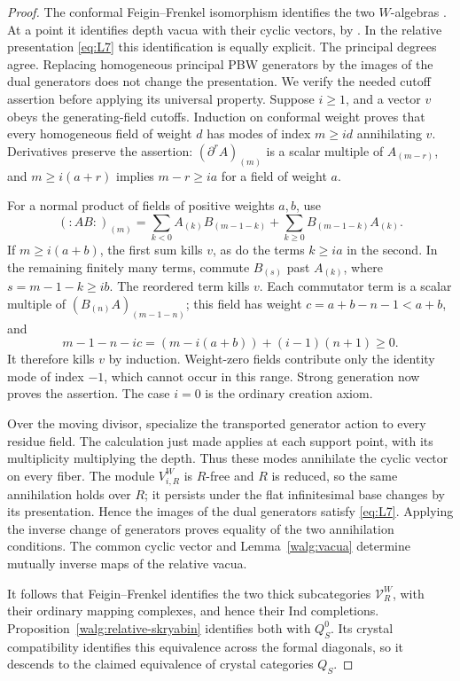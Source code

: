 \begin{proof}
The conformal Feigin--Frenkel isomorphism identifies the two
\(W\)-algebras \cite{FeiginFrenkel}.  At a point it identifies depth
vacua with their cyclic vectors, by \cite[Lemma~7.3.3]{RaskinW}.  In the relative
presentation \eqref{eq:L7} this identification is equally explicit.
The principal degrees agree.  Replacing homogeneous principal PBW
generators by the images of the dual generators does not change the
presentation.  We verify the needed cutoff assertion before applying
its universal property.  Suppose \(i\geq1\), and a vector \(v\) obeys
the generating-field cutoffs.  Induction on conformal weight proves
that every homogeneous field of weight \(d\) has modes of index
\(m\geq id\) annihilating \(v\).  Derivatives preserve the assertion:
\((\partial^r A)_{(m)}\) is a scalar multiple of \(A_{(m-r)}\),
and \(m\geq i(a+r)\) implies \(m-r\geq ia\) for a field of
weight \(a\).

For a normal product of fields of positive weights \(a,b\), use
\[
 (:AB:)_{(m)}=
 \sum_{k<0} A_{(k)}B_{(m-1-k)}+
 \sum_{k\geq0}B_{(m-1-k)}A_{(k)}.
\]
If \(m\geq i(a+b)\), the first sum kills \(v\), as do the terms
\(k\geq ia\) in the second.  In the remaining finitely many terms,
commute \(B_{(s)}\) past \(A_{(k)}\), where \(s=m-1-k\geq ib\).
The reordered term kills \(v\).  Each commutator term is a scalar
multiple of \((B_{(n)}A)_{(m-1-n)}\); this field has weight
\(c=a+b-n-1<a+b\), and
\[
 m-1-n-ic=(m-i(a+b))+(i-1)(n+1)\geq0.
\]
It therefore kills \(v\) by induction.  Weight-zero fields contribute
only the identity mode of index \(-1\), which cannot occur in this
range.  Strong generation now proves the assertion.  The case
\(i=0\) is the ordinary creation axiom.

Over the moving divisor, specialize the transported generator action
to every residue field.  The calculation just made applies at each
support point, with its multiplicity multiplying the depth.  Thus
these modes annihilate the cyclic vector on every fiber.  The module
\(V_{i,R}^W\) is \(R\)-free and \(R\) is reduced, so the same
annihilation holds over \(R\); it persists under the flat
infinitesimal base changes by its presentation.  Hence the images of
the dual generators satisfy \eqref{eq:L7}.  Applying the inverse change of
generators proves equality of the two annihilation conditions.
The common cyclic vector and Lemma~\ref{walg:vacua} determine mutually
inverse maps of the relative vacua.

It follows that Feigin--Frenkel identifies the two thick subcategories
\(\mathcal V_R^W\), with their ordinary mapping complexes, and hence
their Ind completions.  Proposition~\ref{walg:relative-skryabin}
identifies both with \(Q_S^0\).  Its crystal compatibility identifies
this equivalence across the formal diagonals, so it descends to the
claimed equivalence of crystal categories \(Q_S\).


\end{proof}
